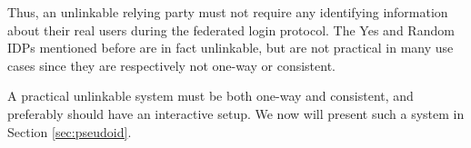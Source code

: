 \documentclass{llncs}
\begin{document}
Thus, an unlinkable relying party must not require any identifying
information about their real users during the federated login
protocol. The Yes and Random IDPs mentioned before are in fact
unlinkable, but are not practical in many use cases since they are
respectively not one-way or consistent.

A practical unlinkable system must be both one-way and consistent, and
preferably should have an interactive setup. We now will present such
a system in Section \ref{sec:pseudoid}.




\end{document}
